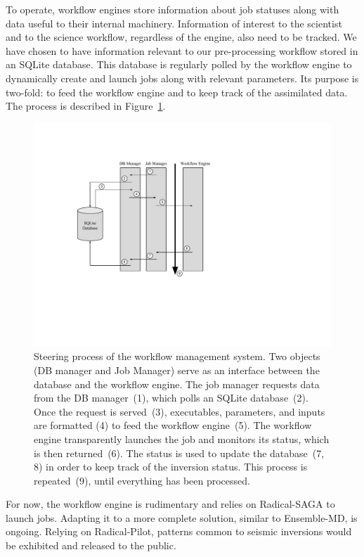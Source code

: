 To operate, workflow engines store information about job statuses along with
data useful to their internal machinery. Information of interest to the
scientist and to the science workflow, regardless of the engine, also need to be
tracked.
We have chosen to have information relevant to our pre-processing workflow
stored in an SQLite database. This database is regularly polled by the workflow
engine to dynamically create and launch jobs along with relevant parameters. Its
purpose is two-fold: to feed the workflow engine and to keep track of the
assimilated data. The process is described in
Figure~\ref{fig:workflow_management}.

\begin{figure}[htbp] %
   \centering
   \includegraphics[width=5in]{ch-workflow/figures/WorkflowManagement.pdf}
   \caption{Steering process of the workflow management system. Two objects (DB
   manager and Job Manager) serve as an interface between the database and the
   workflow engine. The job manager requests data from the DB manager~(1), which
  polls an SQLite database~(2). Once the request is served~(3), executables,
   parameters, and inputs are formatted (4) to feed the workflow engine~(5). The
   workflow engine transparently launches the job and monitors its status, which is
   then returned~(6). The status is used to update the database~(7, 8) in order
   to keep track of the inversion status. This process is repeated~(9), until
   everything has been processed.}
   \label{fig:workflow_management}
\end{figure}

For now, the workflow engine is rudimentary and relies on Radical-SAGA to launch
jobs. Adapting it to a more complete solution, similar to Ensemble-MD, is
ongoing. Relying on Radical-Pilot, patterns common to seismic inversions would
be exhibited and released to the public.


